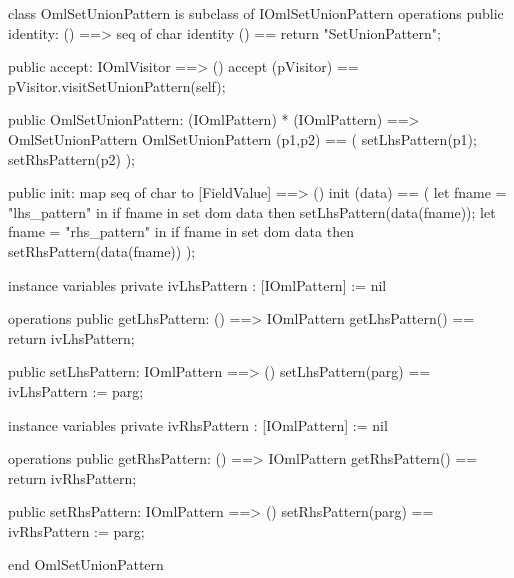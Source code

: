 \begin{vdm_al}
class OmlSetUnionPattern is subclass of IOmlSetUnionPattern
operations
  public identity: () ==> seq of char
  identity () == return "SetUnionPattern";

  public accept: IOmlVisitor ==> ()
  accept (pVisitor) == pVisitor.visitSetUnionPattern(self);

  public OmlSetUnionPattern:
      (IOmlPattern) *
      (IOmlPattern) ==> OmlSetUnionPattern
  OmlSetUnionPattern (p1,p2) == 
   ( setLhsPattern(p1);
     setRhsPattern(p2) );

  public init: map seq of char to [FieldValue] ==> ()
  init (data) ==
    ( let fname = "lhs_pattern" in
        if fname in set dom data
        then setLhsPattern(data(fname));
      let fname = "rhs_pattern" in
        if fname in set dom data
        then setRhsPattern(data(fname)) );

instance variables
  private ivLhsPattern : [IOmlPattern] := nil

operations
  public getLhsPattern: () ==> IOmlPattern
  getLhsPattern() == return ivLhsPattern;

  public setLhsPattern: IOmlPattern ==> ()
  setLhsPattern(parg) == ivLhsPattern := parg;

instance variables
  private ivRhsPattern : [IOmlPattern] := nil

operations
  public getRhsPattern: () ==> IOmlPattern
  getRhsPattern() == return ivRhsPattern;

  public setRhsPattern: IOmlPattern ==> ()
  setRhsPattern(parg) == ivRhsPattern := parg;

end OmlSetUnionPattern
\end{vdm_al}

